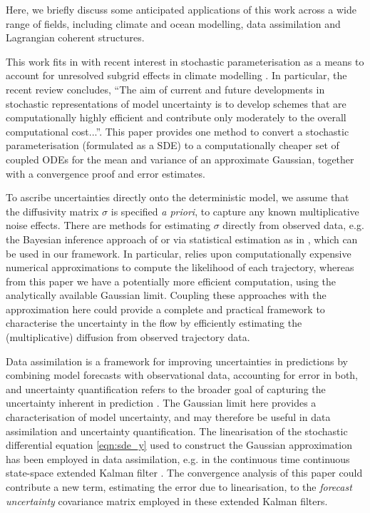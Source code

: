Here, we briefly discuss some anticipated applications of this work across a wide range of fields, including climate and ocean modelling, data assimilation and Lagrangian coherent structures.

This work fits in with recent interest in stochastic parameterisation as a means to account for unresolved subgrid effects in climate modelling \cite{BernerEtAl_2017_StochasticParameterizationNew,LeutbecherEtAl_2017_StochasticRepresentationsModel,Palmer_2019_StochasticWeatherClimate}. 
In particular, the recent review \cite{LeutbecherEtAl_2017_StochasticRepresentationsModel} concludes, ``The aim of current and future developments in stochastic representations of model uncertainty is to develop schemes that are computationally highly efficient and contribute only moderately to the overall computational cost...''.
This paper provides one method to convert a stochastic parameterisation (formulated as a SDE) to a computationally cheaper set of coupled ODEs for the mean and variance of an approximate Gaussian, together with a convergence proof and error estimates. 

To ascribe uncertainties directly onto the deterministic model, we assume that the diffusivity matrix \(\sigma\) is specified \textit{a priori}, to capture any known multiplicative noise effects.
There are methods for estimating \(\sigma\) directly from observed data, e.g. the Bayesian inference approach of \cite{YingEtAl_2019_BayesianInferenceOcean} or via statistical estimation as in \cite{CotterPavliotis_2009_EstimatingEddyDiffusivities}, which can be used in our framework.
In particular, \cite{YingEtAl_2019_BayesianInferenceOcean} relies upon computationally expensive numerical approximations to compute the likelihood of each trajectory, whereas from this paper we have a potentially more efficient computation, using the analytically available Gaussian limit.
Coupling these approaches with the approximation here could provide a complete and practical framework to characterise the uncertainty in the flow by efficiently estimating the (multiplicative) diffusion from observed trajectory data.

Data assimilation is a framework for improving uncertainties in predictions by combining model forecasts with observational data, accounting for error in both, and uncertainty quantification refers to the broader goal of capturing the uncertainty inherent in prediction \cite{BudhirajaEtAl_2019_AssimilatingDataModels,Jazwinski_2014_StochasticProcessesFiltering,LawEtAl_2015_DataAssimilationMathematical,ReichCotter_2015_ProbabilisticForecastingBayesian}.
The Gaussian limit here provides a characterisation of model uncertainty, and may therefore be useful in data assimilation and uncertainty quantification.
The linearisation of the stochastic differential equation \eqref{eqn:sde_y} used to construct the Gaussian approximation has been employed in data assimilation, e.g. in the continuous time continuous state-space extended Kalman filter \cite[\S 9]{Jazwinski_2014_StochasticProcessesFiltering}. The convergence analysis of this paper could contribute a new term, estimating the error due to linearisation, to the \emph{forecast uncertainty} covariance matrix employed in these extended Kalman filters. 

